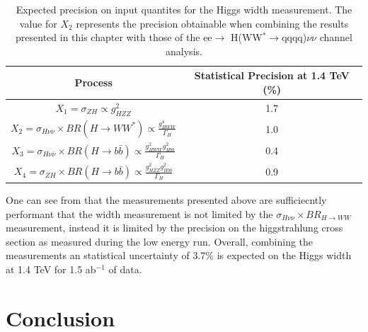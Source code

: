 \begin{table}
  \centering
  \begin{tabular}{c c }
   \toprule
    Process & Statistical Precision at 1.4 TeV (\%)    \\
    \midrule
    $X_1=\sigma_{ZH} \propto g_{HZZ}^2$ & 1.7 \\
    \midrule
    $X_2=\sigma_{H\nu\bar{\nu}} \times BR(H\rightarrow WW^*) \propto \frac{g_{HWW}^4}{\Gamma_H}$ & 1.0\\
    \midrule
    $X_3=\sigma_{H\nu\bar{\nu}} \times BR(H\rightarrow b\bar{b}) \propto \frac{g_{HWW}^{2}g_{Hbb}^2}{\Gamma_H}$ & 0.4\\
    \midrule
    $X_4=\sigma_{ZH} \times BR(H\rightarrow b\bar{b}) \propto \frac{g_{HZZ}^{2}g_{Hbb}^2}{\Gamma_H}$ & 0.9 \\
    \bottomrule
  \end{tabular}
  \caption[Expected precision on input quantites for the Higgs width measurement]{Expected precision on input quantites for the Higgs width measurement\cite{Abramowicz:2016zbo}. The value for $X_2$ represents the precision obtainable when combining the results presented in this chapter with those of the ee$\rightarrow$ H(WW$^*\rightarrow$qqqq)$\nu\nu$ channel analysis.}
  \label{fig:higgscomparison}
\end{table}

One can see from  that the measurements presented above are sufficiecntly performant that the width measurement is not limited by the $\sigma_{H\nu\nu}\times BR_{H\rightarrow WW}$ measurement, instead it is limited by the precision on the higgstrahlung cross section as measured during the low energy run. Overall, combining the measurements an statistical uncertainty of 3.7\% is expected on the Higgs width at 1.4 TeV for 1.5 ab$^{-1}$ of data.

\section{Conclusion}

